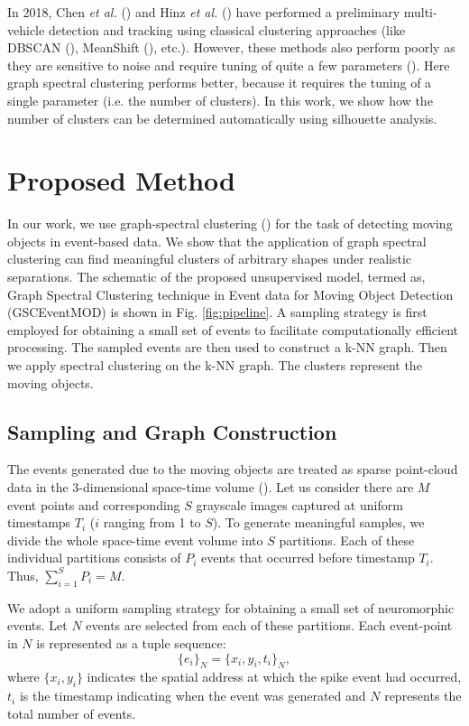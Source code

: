 \documentclass{article}
\begin{document}
In 2018, Chen \textit{et al.} (\cite{chen2018neuromorphic}) and Hinz \textit{et al.} (\cite{hinz2017online}) have performed a preliminary multi-vehicle detection and tracking using classical clustering approaches (like DBSCAN (\cite{khan2014dbscan}), MeanShift (\cite{derpanis2005mean}), etc.).
However, these methods also perform poorly as they are sensitive to noise and require tuning of quite a few parameters (\cite{feng2018robust}). Here graph spectral clustering performs better, because it requires the tuning of a single parameter (i.e. the number of clusters). In this work, we show how the number of clusters can be determined automatically using silhouette analysis.

\section{Proposed Method}
In our work, we use graph-spectral clustering (\cite{luo2003spectral,martin2018robust}) for the task of detecting moving objects in event-based data. We show that the application of graph spectral clustering can find meaningful clusters of arbitrary shapes under realistic separations. The schematic of the proposed unsupervised model, termed as, Graph Spectral Clustering technique in Event data for Moving Object Detection (GSCEventMOD) is shown in Fig. \ref{fig:pipeline}. A sampling strategy is first employed for obtaining a small set of events to facilitate computationally efficient processing. The sampled events are then used to construct a k-NN graph. Then we apply spectral clustering on the k-NN graph. The clusters represent the moving objects. 


\subsection{Sampling and Graph Construction}
The events generated due to the moving objects are treated as sparse point-cloud data in the 3-dimensional space-time volume (\cite{chen2020event}). Let us consider there are $M$ event points and corresponding $S$ grayscale images captured at uniform timestamps $T_i$ ($i$ ranging from 1 to $S$). To generate meaningful samples, we divide the whole space-time event volume into $S$ partitions. Each of these individual partitions consists of $P_i$ events that occurred before timestamp $T_i$. Thus, $\sum_{i=1}^{S} P_i = M$. 

We adopt a uniform sampling strategy for obtaining a small set of neuromorphic events. Let $N$ events are selected from each of these partitions. Each event-point in $N$ is represented as a tuple sequence:
\begin{equation} \label{tuple}
\{e_i\}_N = \{x_i , y_i , t_i\}_N,
\end{equation}
where $\{x_i, y_i\}$ indicates the spatial address at which the spike event had occurred, $t_i$ is the timestamp indicating when the event was generated and $N$ represents the total number of events. 
\end{document}
